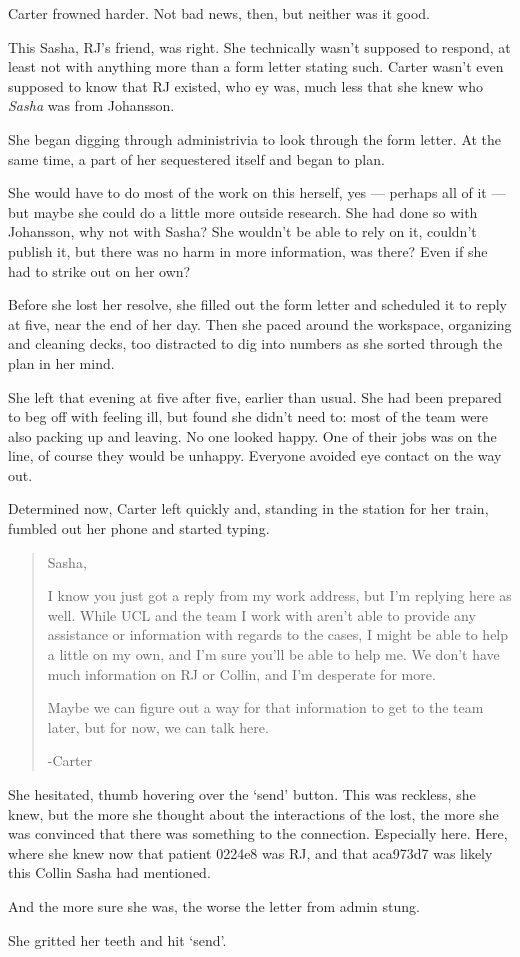 Carter frowned harder. Not bad news, then, but neither was it good.

This Sasha, RJ's friend, was right. She technically wasn't supposed to respond, at least not with anything more than a form letter stating such. Carter wasn't even supposed to know that RJ existed, who ey was, much less that she knew who \emph{Sasha} was from Johansson.

She began digging through administrivia to look through the form letter. At the same time, a part of her sequestered itself and began to plan.

She would have to do most of the work on this herself, yes — perhaps all of it — but maybe she could do a little more outside research. She had done so with Johansson, why not with Sasha? She wouldn't be able to rely on it, couldn't publish it, but there was no harm in more information, was there? Even if she had to strike out on her own?

Before she lost her resolve, she filled out the form letter and scheduled it to reply at five, near the end of her day. Then she paced around the workspace, organizing and cleaning decks, too distracted to dig into numbers as she sorted through the plan in her mind.

She left that evening at five after five, earlier than usual. She had been prepared to beg off with feeling ill, but found she didn't need to: most of the team were also packing up and leaving. No one looked happy. One of their jobs was on the line, of course they would be unhappy. Everyone avoided eye contact on the way out.

Determined now, Carter left quickly and, standing in the station for her train, fumbled out her phone and started typing.

\begin{quote}
Sasha,

I know you just got a reply from my work address, but I'm replying here as well. While UCL and the team I work with aren't able to provide any assistance or information with regards to the cases, I might be able to help a little on my own, and I'm sure you'll be able to help me. We don't have much information on RJ or Collin, and I'm desperate for more.

Maybe we can figure out a way for that information to get to the team later, but for now, we can talk here.

-Carter
\end{quote}

She hesitated, thumb hovering over the `send' button. This was reckless, she knew, but the more she thought about the interactions of the lost, the more she was convinced that there was something to the connection. Especially here. Here, where she knew now that patient 0224e8 was RJ, and that aca973d7 was likely this Collin Sasha had mentioned.

And the more sure she was, the worse the letter from admin stung.

She gritted her teeth and hit `send'.
